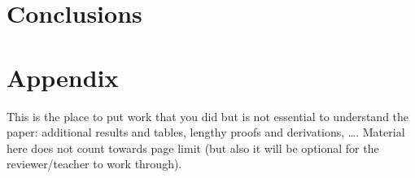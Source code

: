 \documentclass[journal, a4paper]{IEEEtran}
\begin{document}
\section{Conclusions}
\label{sec:conclusion}




\newpage
\section*{Appendix}
This is the place to put work that you did but is not essential to understand the paper: additional results and tables, lengthy proofs and derivations, \ldots. Material here does not count towards page limit (but also it will be optional for the reviewer/teacher to work through). 
\end{document}
